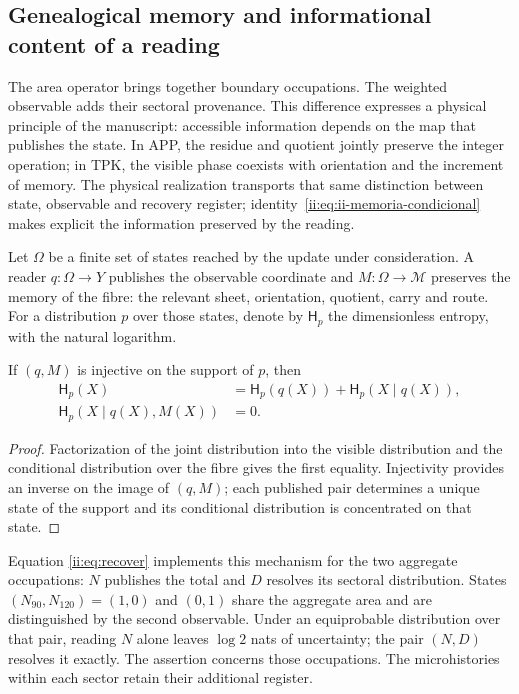 \subsection{Genealogical memory and informational content of a reading}
\label{ii:sec:ii-memoria-lectura}

The area operator brings together boundary occupations. The weighted
observable adds their sectoral provenance. This difference expresses a
physical principle of the manuscript: accessible information depends on
the map that publishes the state. In APP, the residue and quotient
jointly preserve the integer operation; in TPK, the visible phase
coexists with orientation and the increment of memory. The physical
realization transports that same distinction between state, observable and
recovery register; identity~\eqref{ii:eq:ii-memoria-condicional} makes explicit the information preserved by the reading.

Let \(\Omega\) be a finite set of states reached by the
update under consideration. A reader \(q:\Omega\to Y\) publishes the
observable coordinate and \(M:\Omega\to\mathcal M\) preserves the memory
of the fibre: the relevant sheet, orientation, quotient, carry and route.
For a distribution \(p\) over those states, denote by
\(\mathsf H_p\) the dimensionless entropy, with the natural logarithm.

\begin{proposition}
If \((q,M)\) is injective on the support of \(p\), then
\begin{align}
 \mathsf H_p(X)&=\mathsf H_p(q(X))+
                 \mathsf H_p(X\mid q(X)),\\
 \mathsf H_p(X\mid q(X),M(X))&=0.
 \label{ii:eq:ii-memoria-condicional}
\end{align}
\end{proposition}
\begin{proof}
Factorization of the joint distribution into the visible distribution
and the conditional distribution over the fibre gives the first equality.
Injectivity provides an inverse on the image of \((q,M)\);
each published pair determines a unique state of the support and its
conditional distribution is concentrated on that state.
\end{proof}

Equation \eqref{ii:eq:recover} implements this mechanism for the two
aggregate occupations: \(N\) publishes the total and \(D\) resolves its
sectoral distribution. States \((N_{90},N_{120})=(1,0)\) and
\((0,1)\) share the aggregate area and are distinguished by the second
observable. Under an equiprobable distribution over that pair, reading
\(N\) alone leaves \(\log2\) nats of uncertainty;
the pair \((N,D)\) resolves it exactly. The assertion concerns
those occupations. The microhistories within each sector retain
their additional register.

